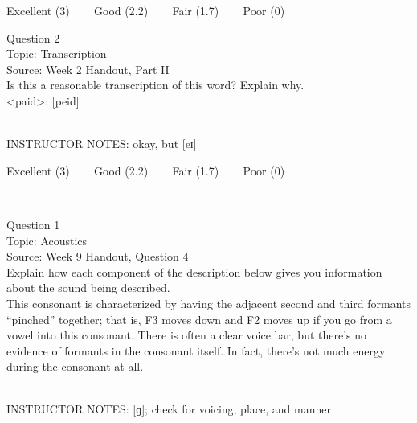 \documentclass[12pt]{article}
\begin{document}
\vfill
Excellent (3) ~~~ Good (2.2) ~~~ Fair (1.7) ~~~ Poor (0)
\newpage

{\large Question 2}\\

Topic: Transcription\\
Source: Week 2 Handout, Part II\\

Is this a reasonable transcription of this word? Explain why.\\

<paid>: {[peid]}


~\\
INSTRUCTOR NOTES: okay, but [eɪ]


\vfill
Excellent (3) ~~~ Good (2.2) ~~~ Fair (1.7) ~~~ Poor (0)
\newpage

\begin{center}
\textbf{{\color{red}{\HUGE END OF EXAM}}}\\

\end{center}
\newpage

\begin{center}
\textbf{{\color{blue}{\HUGE START OF EXAM\\}}}

\textbf{{\color{blue}{\HUGE Student ID: 30794\\}}}

\textbf{{\color{blue}{\HUGE 4:40\\}}}

\end{center}
\newpage

{\large Question 1}\\

Topic: Acoustics\\
Source: Week 9 Handout, Question 4\\

Explain how each component of the description below gives you information about the sound being described.\\

This consonant is characterized by having the adjacent second and third formants “pinched” together; that is, F3 moves down and F2 moves up if you go from a vowel into this consonant. There is often a clear voice bar, but there’s no evidence of formants in the consonant itself. In fact, there’s not much energy during the consonant at all.


~\\
INSTRUCTOR NOTES: [ɡ]; check for voicing, place, and manner
\end{document}
